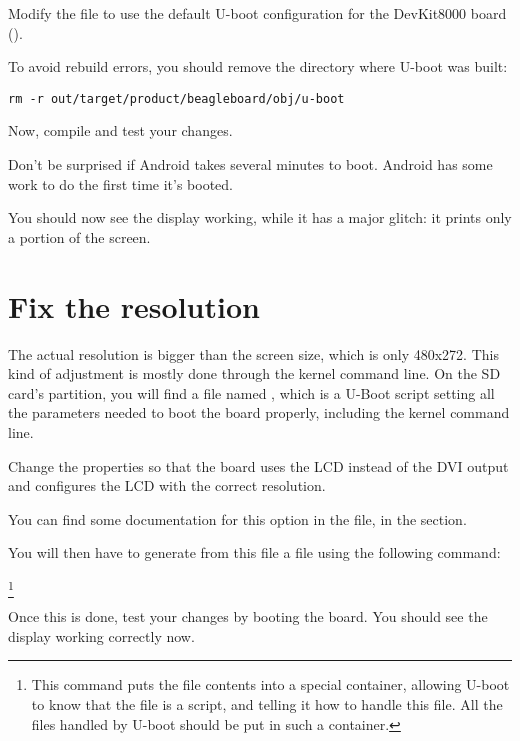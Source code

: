 Modify the  file to use the default U-boot
configuration for the DevKit8000 board ().

To avoid rebuild errors, you should remove the directory where U-boot
was built:

\begin{verbatim}
rm -r out/target/product/beagleboard/obj/u-boot
\end{verbatim}

Now, compile and test your changes.

Don't be surprised if Android takes several minutes to boot. Android
has some work to do the first time it's booted.

You should now see the display working, while it has a major glitch:
it prints only a portion of the screen.

\section{Fix the resolution}

The actual resolution is bigger than the screen size, which 
is only 480x272. This kind of adjustment is mostly done
through the kernel command line. On the SD card's 
partition, you will find a file named , which is a
U-Boot script setting all the parameters needed to boot the board
properly, including the kernel command line.

Change the  properties so that the board uses
the LCD instead of the DVI output and configures the LCD with the 
correct resolution.

You can find some documentation for this option in the
 file, in the
 section.

You will then have to generate from this  file a
 file using the following command:

\footnote{This command puts the  file contents into a
  special container, allowing U-boot to know that the 
  file is a script, and telling it how to handle this file. All the
  files handled by U-boot should be put in such a container.}
 
Once this is done, test your changes by booting the board. You should
see the display working correctly now.

